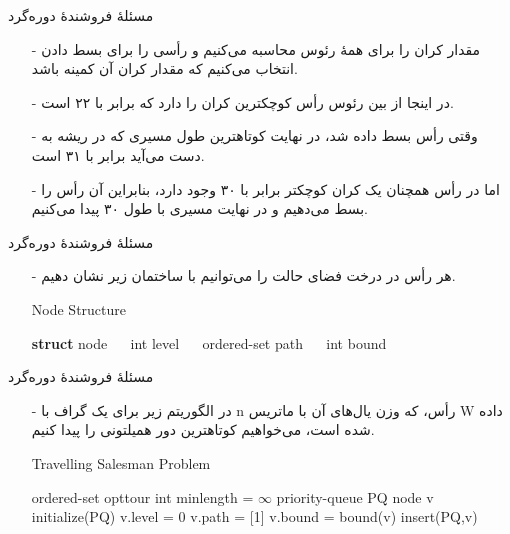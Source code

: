 \begin{frame}{مسئلهٔ فروشندهٔ دوره‌گرد}
\begin{itemize}\itemr
\item[-]
مقدار کران را برای همهٔ رئوس محاسبه می‌کنیم و رأسی را برای بسط دادن انتخاب می‌کنیم که مقدار کران آن کمینه باشد.
\item[-]
در اینجا از بین رئوس
\m{[1,2], [1,3], [1,4], [1,5]}
رأس 
\m{[1,3]}
کوچکترین کران را دارد که برابر با ۲۲ است.
\item[-]
وقتی رأس 
\m{[1,3]}
بسط داده شد، در نهایت کوتاهترین طول مسیری که در ریشه به دست می‌آید برابر با ۳۱ است.
\item[-]
اما در رأس 
\m{[1,4]}
همچنان یک کران کوچکتر برابر با ۳۰ وجود دارد،‌ بنابراین آن رأس را بسط می‌دهیم و در نهایت مسیری با طول ۳۰ پیدا می‌کنیم.
\end{itemize}
\end{frame} 


\begin{frame}{مسئلهٔ فروشندهٔ دوره‌گرد}
\begin{itemize}\itemr
\item[-]
هر رأس در درخت فضای حالت را می‌توانیم با ساختمان زیر نشان دهیم.
\begin{algorithm}[H]\alglr
\caption{Node Structure} 
\begin{algorithmic}[1]
\Statex \textbf{struct} node
\State~~ int level 
\State~~ ordered-set path
\State~~ int bound
\end{algorithmic}
\label{alg:node-structure}
\end{algorithm}
\end{itemize}
\end{frame} 


\begin{frame}{مسئلهٔ فروشندهٔ دوره‌گرد}
\begin{itemize}\itemr
\item[-]
در الگوریتم زیر برای یک گراف با n رأس، که وزن یال‌های آن با ماتریس W داده شده است، می‌خواهیم کوتاهترین دور همیلتونی را پیدا کنیم.
\begin{algorithm}[H]\alglr
  \caption{Travelling Salesman Problem} 
  \begin{algorithmic}[1]
   \State ordered-set opttour 
   \State int minlength = $\infty$ 
   \State priority-queue PQ
   \State node v
   \State initialize(PQ)		
   \State v.level = 0
   \State v.path = [1]	
   \State v.bound = bound(v)		
   \State insert(PQ,v)                           
  \end{algorithmic}
  \label{alg:tsp1}
\end{algorithm}
\end{itemize}
\end{frame} 



